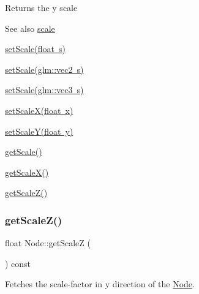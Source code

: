 \begin{DoxyReturn}{Returns}
the y scale 
\end{DoxyReturn}
\begin{DoxySeeAlso}{See also}
\mbox{\hyperlink{classsage_1_1Node_a686c3edeea1faab8b566bfdf2fe3f906}{scale}} 

\mbox{\hyperlink{classsage_1_1Node_a939698b2eb68ee5b60b91e2426e95369}{set\+Scale(float s)}} 

\mbox{\hyperlink{classsage_1_1Node_aecff30b003ce1c2266cc60a34b72559d}{set\+Scale(glm\+::vec2 s)}} 

\mbox{\hyperlink{classsage_1_1Node_a7481b934a6ef259a14aee4d0b87cb2aa}{set\+Scale(glm\+::vec3 s)}} 

\mbox{\hyperlink{classsage_1_1Node_ab8126397f90ccdee0755b984b26809d8}{set\+Scale\+X(float x)}} 

\mbox{\hyperlink{classsage_1_1Node_afa22161545d63e9e011f8eeb5acdead7}{set\+Scale\+Y(float y)}} 

\mbox{\hyperlink{classsage_1_1Node_ac41e15cac1e23a4c48798291c70dcdd8}{get\+Scale()}} 

\mbox{\hyperlink{classsage_1_1Node_a27040ef8ab59ccf42b87d6ddc8d794e6}{get\+Scale\+X()}} 

\mbox{\hyperlink{classsage_1_1Node_a0b55ddbe04d126953e1db8606d9a9ecd}{get\+Scale\+Z()}} 
\end{DoxySeeAlso}
\mbox{\label{classsage_1_1Node_a0b55ddbe04d126953e1db8606d9a9ecd}} 
\subsubsection{\texorpdfstring{getScaleZ()}{getScaleZ()}}
{\footnotesize\ttfamily float Node\+::get\+ScaleZ (\begin{DoxyParamCaption}{ }\end{DoxyParamCaption}) const}



Fetches the scale-\/factor in y direction of the \mbox{\hyperlink{classsage_1_1Node}{Node}}. 

